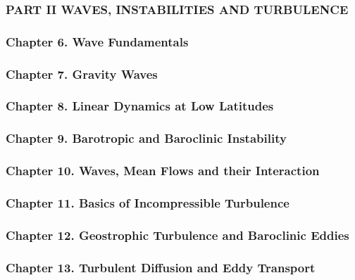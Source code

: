 \subsubsection{PART II WAVES, INSTABILITIES AND
TURBULENCE}\label{part-ii-waves-instabilities-and-turbulence}

\subsubsection{Chapter 6. Wave
Fundamentals}\label{chapter-6.-wave-fundamentals}

\subsubsection{Chapter 7. Gravity Waves}\label{chapter-7.-gravity-waves}

\subsubsection{Chapter 8. Linear Dynamics at Low
Latitudes}\label{chapter-8.-linear-dynamics-at-low-latitudes}

\subsubsection{Chapter 9. Barotropic and Baroclinic
Instability}\label{chapter-9.-barotropic-and-baroclinic-instability}

\subsubsection{Chapter 10. Waves, Mean Flows and their
Interaction}\label{chapter-10.-waves-mean-flows-and-their-interaction}

\subsubsection{Chapter 11. Basics of Incompressible
Turbulence}\label{chapter-11.-basics-of-incompressible-turbulence}

\subsubsection{Chapter 12. Geostrophic Turbulence and Baroclinic
Eddies}\label{chapter-12.-geostrophic-turbulence-and-baroclinic-eddies}

\subsubsection{Chapter 13. Turbulent Diffusion and Eddy
Transport}\label{chapter-13.-turbulent-diffusion-and-eddy-transport}

